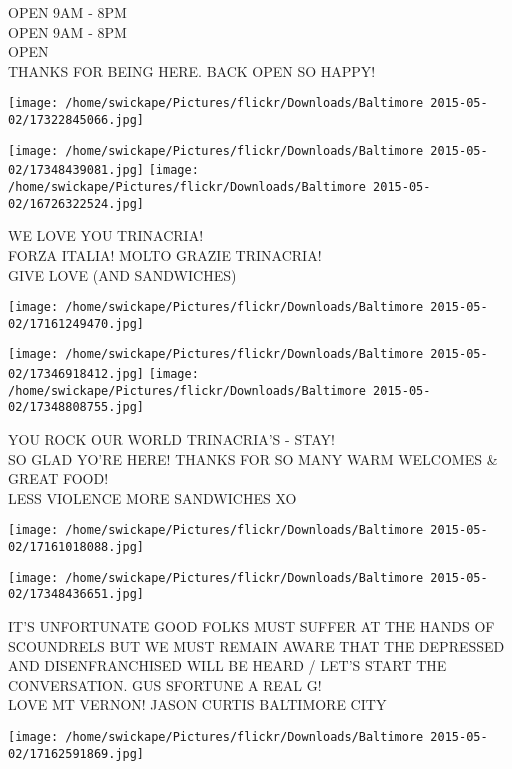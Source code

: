 \documentclass[10pt,letterpaper]{article}
\begin{document}
OPEN 9AM {-} 8PM\\
OPEN 9AM {-} 8PM\\
OPEN\\
THANKS FOR BEING HERE.  BACK OPEN SO HAPPY!\\
\pagebreak

\texttt{[image: /home/swickape/Pictures/flickr/Downloads/Baltimore 2015-05-02/17322845066.jpg]}

\vspace{0.25in}
\texttt{[image: /home/swickape/Pictures/flickr/Downloads/Baltimore 2015-05-02/17348439081.jpg]}
\texttt{[image: /home/swickape/Pictures/flickr/Downloads/Baltimore 2015-05-02/16726322524.jpg]}

WE LOVE YOU TRINACRIA!\\
FORZA ITALIA!  MOLTO GRAZIE TRINACRIA!\\
GIVE LOVE (AND SANDWICHES)\\
\pagebreak

\texttt{[image: /home/swickape/Pictures/flickr/Downloads/Baltimore 2015-05-02/17161249470.jpg]}

\vspace{0.25in}
\texttt{[image: /home/swickape/Pictures/flickr/Downloads/Baltimore 2015-05-02/17346918412.jpg]}
\texttt{[image: /home/swickape/Pictures/flickr/Downloads/Baltimore 2015-05-02/17348808755.jpg]}

YOU ROCK OUR WORLD TRINACRIA'S {-} STAY!\\
SO GLAD YO'RE HERE!  THANKS FOR SO MANY WARM WELCOMES \& GREAT FOOD!\\
LESS VIOLENCE MORE SANDWICHES XO\\
\pagebreak

\texttt{[image: /home/swickape/Pictures/flickr/Downloads/Baltimore 2015-05-02/17161018088.jpg]}

\vspace{0.25in}
\texttt{[image: /home/swickape/Pictures/flickr/Downloads/Baltimore 2015-05-02/17348436651.jpg]}

IT'S UNFORTUNATE GOOD FOLKS MUST SUFFER AT THE HANDS OF SCOUNDRELS BUT WE MUST REMAIN AWARE THAT THE DEPRESSED AND DISENFRANCHISED WILL BE HEARD / LET'S START THE CONVERSATION.  GUS SFORTUNE A REAL G!\\
LOVE MT VERNON!  JASON CURTIS BALTIMORE CITY\\
\pagebreak

\texttt{[image: /home/swickape/Pictures/flickr/Downloads/Baltimore 2015-05-02/17162591869.jpg]}
\end{document}
